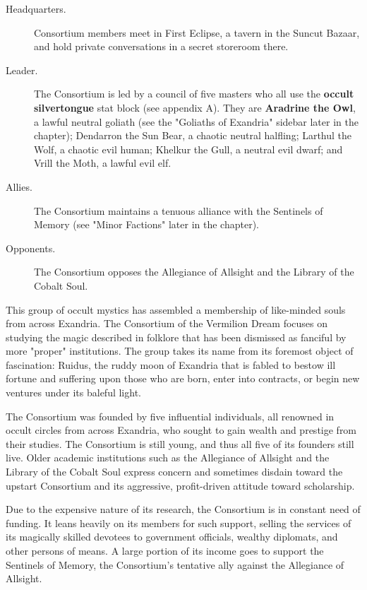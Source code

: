 \documentclass[10pt,a4paper,twoside,bg=print,twocolumn,openany,nodeprecatedcode]{dndbook}
\begin{document}
\begin{description}
\item[Headquarters.]
Consortium members meet in First Eclipse, a tavern in the Suncut Bazaar, and hold private conversations in a secret storeroom there.
\item[Leader.]
The Consortium is led by a council of five masters who all use the \textbf{occult silvertongue} stat block (see appendix A). They are \textbf{Aradrine the Owl}, a lawful neutral goliath (see the "Goliaths of Exandria" sidebar later in the chapter); Dendarron the Sun Bear, a chaotic neutral halfling; Larthul the Wolf, a chaotic evil human; Khelkur the Gull, a neutral evil dwarf; and Vrill the Moth, a lawful evil elf.
\item[Allies.]
The Consortium maintains a tenuous alliance with the Sentinels of Memory (see "Minor Factions" later in the chapter).
\item[Opponents.]
The Consortium opposes the Allegiance of Allsight and the Library of the Cobalt Soul.
\end{description}

This group of occult mystics has assembled a membership of like-minded souls from across Exandria. The Consortium of the Vermilion Dream focuses on studying the magic described in folklore that has been dismissed as fanciful by more "proper" institutions. The group takes its name from its foremost object of fascination: Ruidus, the ruddy moon of Exandria that is fabled to bestow ill fortune and suffering upon those who are born, enter into contracts, or begin new ventures under its baleful light.

The Consortium was founded by five influential individuals, all renowned in occult circles from across Exandria, who sought to gain wealth and prestige from their studies. The Consortium is still young, and thus all five of its founders still live. Older academic institutions such as the Allegiance of Allsight and the Library of the Cobalt Soul express concern and sometimes disdain toward the upstart Consortium and its aggressive, profit-driven attitude toward scholarship.

Due to the expensive nature of its research, the Consortium is in constant need of funding. It leans heavily on its members for such support, selling the services of its magically skilled devotees to government officials, wealthy diplomats, and other persons of means. A large portion of its income goes to support the Sentinels of Memory, the Consortium's tentative ally against the Allegiance of Allsight.
\end{document}
